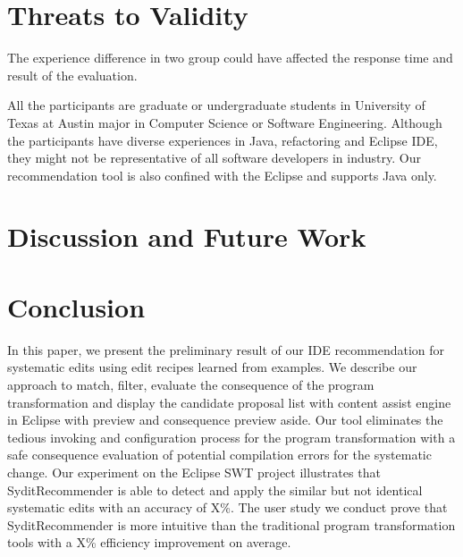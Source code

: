 \section{Threats to Validity}\label{sec:validity}

 The experience difference in two group could have affected the response time and result of the evaluation. %


  All the participants are graduate or undergraduate students in University of Texas at Austin major in Computer Science or Software Engineering. Although the participants have diverse experiences in Java, refactoring and Eclipse IDE, they might not be representative of all software developers in industry. Our recommendation tool is also confined with the Eclipse and supports Java only. 

\section{Discussion and Future Work}\label{sec:discussion}


\section{Conclusion}\label{sec:conclusion}
In this paper, we present the preliminary result of our IDE recommendation for systematic edits using edit recipes learned from examples. We describe our approach to match, filter, evaluate the consequence of the program transformation  and display the candidate proposal list with content assist engine in Eclipse with preview and consequence preview aside. Our tool eliminates the tedious invoking and configuration process for the program transformation with a safe consequence evaluation of potential compilation errors for the systematic change. Our experiment on the Eclipse SWT project illustrates that SyditRecommender is able to detect and apply the similar but not identical systematic edits with an accuracy of X\%. The user study we conduct prove that SyditRecommender  is more intuitive than the traditional program transformation tools with a X\% efficiency improvement on average. 



